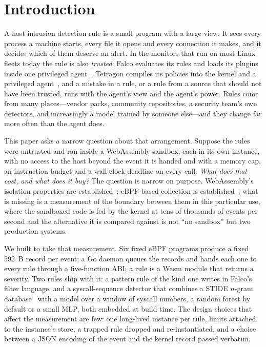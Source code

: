 \section{Introduction}
\label{sec:intro}

A host intrusion detection rule is a small program with a large view. It
sees every process a machine starts, every file it opens and every
connection it makes, and it decides which of them deserve an alert. In the
monitors that run on most Linux fleets today the rule is also
\emph{trusted}: Falco evaluates its rules and loads its plugins inside one
privileged agent~\cite{falco}, Tetragon compiles its policies into the
kernel and a privileged agent~\cite{tetragon}, and a mistake in a rule,
or a rule from a source that should not have been trusted, runs with the
agent's view and the agent's power. Rules come from many places---vendor
packs, community repositories, a security team's own detectors, and
increasingly a model trained by someone else---and they change far more
often than the agent does.

This paper asks a narrow question about that arrangement. Suppose the
rules were untrusted and ran inside a WebAssembly sandbox, each in its own
instance, with no access to the host beyond the event it is handed and
with a memory cap, an instruction budget and a wall-clock deadline on
every call. \emph{What does that cost, and what does it buy?} The
question is narrow on purpose. WebAssembly's isolation properties are
established~\cite{wasm-spec,rlbox,wasmboxc}; eBPF-based collection is
established~\cite{falco,tetragon,tracee}; what is missing is a measurement
of the boundary between them in this particular use, where the sandboxed
code is fed by the kernel at tens of thousands of events per second and
the alternative it is compared against is not ``no sandbox'' but two
production systems.

We built \sys to take that measurement. Six fixed eBPF programs produce a
fixed \SI{592}{B} record per event; a Go daemon queues the records and
hands each one to every rule through a five-function ABI; a rule is a Wasm
module that returns a severity. Two rules ship with it: a pattern rule of
the kind one writes in Falco's filter language, and a syscall-sequence
detector that combines a STIDE $n$-gram database~\cite{stide} with a
model over a window of syscall numbers, a random forest by default or a
small MLP, both embedded at build time. The design choices that affect
the measurement are few: one long-lived instance per rule, limits
attached to the instance's store, a trapped rule dropped and
re-instantiated, and a choice between a JSON encoding of the event and the
kernel record passed verbatim.

